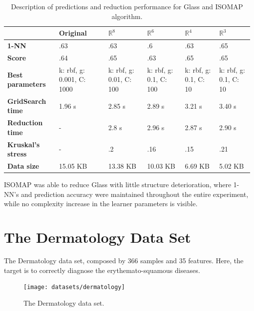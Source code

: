 \begin{table}[H]
	\centering
	
	\begin{tabular}{|p{.15\linewidth}|p{.12\linewidth}|p{.12\linewidth}|p{.12\linewidth}|p{.12\linewidth}|p{.12\linewidth}|}
		\hline
		& \textbf{Original} & $\mathbb{R}^8$ & $\mathbb{R}^6$ & $\mathbb{R}^4$ & $\mathbb{R}^3$ \\\hline
		\textbf{1-NN} & .63 & .63 & .6 & .63 & .65 \\\hline
		\textbf{Score} & .64 & .65 & .63 & .65 & .65 \\\hline
		\textbf{Best parameters} & k: rbf, g: 0.001, C: 1000 & k: rbf, g: 0.01, C: 100 & k: rbf, g: 0.1, C: 100 & k: rbf, g: 0.1, C: 10 & k: rbf, g: 0.1, C: 10\\\hline
		\textbf{GridSearch time} & 1.96 s & 2.85 s & 2.89 s & 3.21 s & 3.40 s \\\hline
		\textbf{Reduction time} & - & 2.8 s & 2.96 s & 2.87 s & 2.90 s \\\hline
		\textbf{Kruskal's stress} & - & .2 & .16 & .15 & .21 \\\hline
		\textbf{Data size} & 15.05 KB & 13.38 KB & 10.03 KB & 6.69 KB & 5.02 KB \\\hline
	\end{tabular}
	\captionsetup{justification=centering}
	\caption{Description of predictions and reduction performance for Glass and ISOMAP algorithm.}
\end{table}

ISOMAP was able to reduce Glass with little structure deterioration, where 1-NN's and prediction accuracy were maintained throughout the entire experiment, while no complexity increase in the learner parameters is visible.

\clearpage
\section{The Dermatology Data Set}

The Dermatology data set, composed by 366 samples and 35 features. Here, the target is to correctly diagnose the erythemato-squamous diseases.
\newline\newline

\begin{figure}[H]
	\centering
	\texttt{[image: datasets/dermatology]}
	\captionsetup{justification=centering}
	\caption{The Dermatology data set.}
\end{figure}

